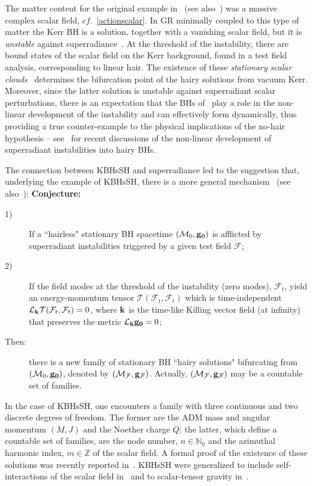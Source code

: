 The matter content for the original example in~\cite{Herdeiro:2014goa} (see also~\cite{Herdeiro:2015gia}) was a massive complex scalar field, $cf.$~\eqref{actionscalar}. In GR minimally coupled to this type of matter the Kerr BH is a solution, together with a vanishing scalar field, but it is \textit{unstable} against superradiance~\cite{Press:1972zz,Damour:1976kh,Brito:2015oca}. At the threshold of the instability, there are bound states of the scalar field on the Kerr background, found in a test field analysis, corresponding to linear hair. The existence of these \textit{stationary scalar clouds}~\cite{Hod:2012px,Hod:2013zza,Herdeiro:2014goa,Hod:2014baa,Benone:2014ssa,Hod:2014npa,Hod:2015ota} determines the bifurcation point of the hairy solutions from vacuum Kerr. Moreover, since the latter solution is unstable against superradiant scalar perturbations, there is an expectation that the BHs of~\cite{Herdeiro:2014goa} play a role in the non-linear development of the instability and can effectively form dynamically, thus providing a true counter-example to the physical implications of the no-hair hypothesis -- see~\cite{Sanchis-Gual:2015lje,Bosch:2016vcp} for recent discussions of the non-linear development of superradiant instabilities into hairy BHs. 

\bigskip

The connection between KBHsSH and superradiance led to the suggestion that, underlying the example of KBHsSH, there is a more general mechanism~\cite{Herdeiro:2014goa,Herdeiro:2014ima} (see also~\cite{Herdeiro:2015waa,Herdeiro:2015gia}): 
\newpage
{\bf Conjecture:}
\begin{description}
\item[1)] If a ``hairless" stationary BH spacetime $(\mathcal{M}_0,{\bf g_0})$ is afflicted by superradiant instabilities triggered by a given test field $\mathcal{F}$;
\item[2)] If the field modes at the threshold of the instability (zero modes), $\mathcal{F}_t$, yield an energy-momentum tensor $\mathcal{T}(\mathcal{F}_t,\mathcal{F}_t)$ which is time-independent $\mathcal{L}_{\bf k}\mathcal{T}(\mathcal{F}_t,\mathcal{F}_t)=0$, where ${\bf k}$ is the time-like Killing vector field (at infinity) that preserves the metric $\mathcal{L}_{\bf k}{\bf g_0}=0$;
\item[Then:] there is a new family of stationary BH ``hairy solutions" bifurcating from $(\mathcal{M}_0,{\bf g_0})$, denoted by $(\mathcal{M}_\mathcal{F},{\bf g_\mathcal{F}})$. Actually, $(\mathcal{M}_\mathcal{F},{\bf g_\mathcal{F}})$ may be a countable set of families.
\end{description}
In the case of KBHsSH, one encounters a family with three continuous and two discrete degrees of freedom. The former are the ADM mass and angular momentum $(M,J)$ and the Noether charge $Q$; the latter, which define a countable set of families, are the node number, $n\in \mathbb{N}_0$ and the azimuthal harmonic index, $m\in \mathbb{Z}$ of the scalar field. A formal proof of the existence of these solutions was recently reported in~\cite{Chodosh:2015oma}. KBHsSH were generalized to include self-interactions of the scalar field in~\cite{Herdeiro:2015tia} and to scalar-tensor gravity in~\cite{Kleihaus:2015iea}.

